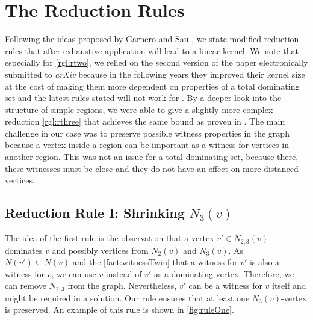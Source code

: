 \section{The Reduction Rules}

Following the ideas proposed by Garnero and Sau \cite[arXiv v2]{Garnero2018}, we state modified reduction rules that after exhaustive application will lead to a linear kernel. We note that especially for \cref{rgl:rtwo}, we relied on the second version of the paper electronically submitted to \textit{arXiv} because in the following years they improved their kernel size at the cost of making them more dependent on properties of a total dominating set and the latest rules stated will not work for \psdom. By a deeper look into the structure of simple regions, we were able to give a slightly more complex reduction \cref{rgl:rthree} that achieves the same bound as proven in \cite{Garnero2018}.  
The main challenge in our case was to preserve possible witness properties in the graph because a vertex inside a region can be important as a witness for vertices in another region. This was not an issue for a total dominating set, because there, these witnesses must be close and they do not have an effect on more distanced vertices. 
\subsection{Reduction Rule I: Shrinking $N_3(v)$}


The idea of the first rule is the observation that a vertex $v' \in N_{2,3}(v)$ dominates $v$ and possibly vertices from $N_2(v)$ and $N_3(v)$. As $N(v') \subseteq N(v)$ and the \cref{fact:witnessTwin} that a witness for $v'$ is also a witness for $v$, we can use $v$ instead of $v'$ as a dominating vertex. Therefore, we can remove $N_{2,3}$ from the graph. Nevertheless, $v'$ can be a witness for $v$ itself and might be required in a solution. Our rule ensures that at least one $N_3(v)$-vertex is preserved. An example of this rule is shown in \cref{fig:ruleOne}.

